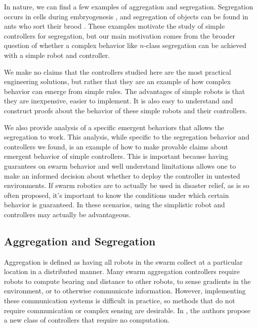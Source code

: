 \documentclass[conference]{IEEEtran}
\begin{document}
  In nature, we can find a few examples of aggregation and segregation. Segregation occurs in cells during embryogenesis \cite{batlle_molecular_2012}, and segregation of objects can be found in ants who sort their brood \cite{santos_segregation_2014}. These examples motivate the study of simple controllers for segregation, but our main motivation comes from the broader question of whether a complex behavior like $n$-class segregation can be achieved with a simple robot and controller.

  We make no claims that the controllers studied here are the most practical engineering solutions, but rather that they are an example of how complex behavior can emerge from simple rules. The advantages of simple robots is that they are inexpensive, easier to implement. It is also easy to understand and construct proofs about the behavior of these simple robots and their controllers.

  We also provide analysis of a specific emergent behaviors that allows the segregation to work. This analysis, while specific to the segregation behavior and controllers we found, is an example of how to make provable claims about emergent behavior of simple controllers. This is important because having guarantees on swarm behavior and well understand limitations allows one to make an informed decision about whether to deploy the controller in untested environments. If swarm robotics are to actually be used in disaster relief, as is so often proposed, it's important to know the conditions under which certain behavior is guaranteed. In these scenarios, using the simplistic robot and controllers may actually be advantageous.

  \subsection{Aggregation and Segregation}

    Aggregation is defined as having all robots in the swarm collect at a particular location in a distributed manner. Many swarm aggregation controllers require robots to compute bearing and distance to other robots, to sense gradients in the environment, or to otherwise communicate information. However, implementing these communication systems is difficult in practice, so methods that do not require communication or complex sensing are desirable. In \cite{gauci_self-organized_2014}, the authors propose a new class of controllers that require no computation.
\end{document}
